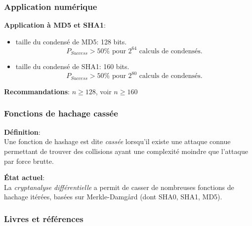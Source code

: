 \begin{frame}
  \frametitle{Application numérique}
  \vfill

\textbf{Application à MD5 et SHA1}:
\begin{itemize}
\item taille du condensé de MD5: 128 bits.
$$P_{Success} > 50\% \mbox{ pour } 2^{64} \mbox{ calculs de condensés.}$$
\item taille du condensé de SHA1: 160 bits.
$$P_{Success} > 50\% \mbox{ pour } 2^{80} \mbox{ calculs de condensés.}$$
\end{itemize}
  \vspace{0.3cm}
\textbf{Recommandations}: $n \ge 128$, voir $n\ge 160$
  \vfill
\end{frame}

\begin{frame}
  \frametitle{Fonctions de hachage cassée}
  \vfill
\textbf{Définition}:\\
Une fonction de hashage est dite \emph{cassée} lorsqu'il existe une attaque connue permettant de trouver des collisions ayant une complexité moindre que l'attaque par force brutte.
  \vspace{1.5cm}
  
\textbf{État actuel}:\\
La \emph{cryptanalyse différentielle} a permit de casser de nombreuses fonctions de hachage itérées, basées sur Merkle-Damg\r{a}rd (dont SHA0, SHA1, MD5).
  \vfill
\end{frame}





\nocite{*}


\begin{frame}[allowframebreaks]
  \frametitle{Livres et références}
  
\end{frame}

\begin{frame}
  \vfill
  \centering
  \vfill
\end{frame}
